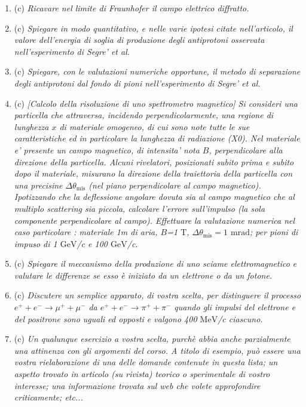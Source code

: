 \documentclass{article}
\renewcommand{\c}{(c)}
\renewcommand{\t}[1]{\textit{ #1}}
\begin{document}
\begin{enumerate}
{		e’ l’energia per unita’ di
		frequenza irraggiata da una carica accelerata in funzione dell’angolo di
		emissione.}
	\item\c\t{Ricavare nel limite di Fraunhofer il campo elettrico diffratto.}
	\item\c\t{Spiegare in modo quantitativo, e nelle varie ipotesi citate nell'articolo, il valore
		dell'energia di soglia di produzione degli antiprotoni osservata nell’esperimento di
		Segre’ et al.}
	\item\c\t{Spiegare, con le valutazioni numeriche opportune, il metodo di separazione degli
		antiprotoni dal fondo di pioni nell’esperimento di Segre’ et al.}
	\item\c\t{[Calcolo della risoluzione di uno spettrometro magnetico] Si consideri una
		particella che attraversa, incidendo perpendicolarmente, una regione di lunghezza
		$x$ di materiale omogeneo, di cui sono note tutte le sue caratteristiche ed in
		particolare la lunghezza di radiazione (X0). Nel materiale e' presente un campo
		magnetico, di intensita' nota $B$, perpendicolare alla direzione della particella.
		Alcuni rivelatori, posizionati subito prima e subito dopo il materiale, misurano la
		direzione della traiettoria della particella con una precisine $\Delta\theta_\mathrm{mis}$ (nel piano
		perpendicolare al campo magnetico). Ipotizzando che la deflessione angolare
		dovuta sia al campo magnetico che al multiplo scattering sia piccola, calcolare
		l'errore sull'impulso (la sola componente perpendicolare al campo). Effettuare la
		valutazione numerica nel caso particolare : materiale 1m di aria, $B$=1 $\mathrm{T}$, $\Delta\theta_\mathrm{mis}=1$ $\mathrm{mrad}$; per pioni di impuso di 1 $\mathrm{GeV}$/c e 100 $\mathrm{GeV}$/c.}
	\item\c\t{Spiegare il meccanismo della produzione di uno sciame elettromagnetico e
		valutare le differenze se esso è iniziato da un elettrone o da un fotone.}
	\item\c\t{Discutere un semplice apparato, di vostra scelta, per distinguere il processo
		$e^+ + e^- \to \mu^+ +\mu^-$
		da $e^+ + e^- \to \pi^+ + \pi^-$
		quando gli impulsi del elettrone e del
		positrone sono uguali ed opposti e valgono 400 $\mathrm{MeV}$/c ciascuno.}
	\item\c\t{Un qualunque esercizio a vostra scelta, purchè abbia anche parzialmente una
		attinenza con gli argomenti del corso. A titolo di esempio, può essere una vostra
		rielaborazione di una delle domande contenute in questa lista; un aspetto trovato
		in articolo (su rivista) teorico o sperimentale di vostro interesse; una
		informazione trovata sul web che volete approfondire criticamente; etc...}
\end{enumerate}
\end{document}
